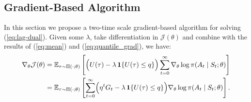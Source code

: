\subsection{Gradient-Based Algorithm}
In this section we propose a two-time scale gradient-based algorithm for solving (\ref{eq:lag-dual}). Given some $\lambda$, take differentiation in $\mathcal{J}(\theta)$ and combine with the results of (\ref{eq:mean}) and (\ref{eq:quantile_grad}), we have:
\textbf{\textcolor{ECNURed}{
\begin{align} \label{mix_gradient}
    \nabla_\theta\mathcal{J}(\theta)
    &=\mathbb E_{\tau\sim\Pi(\cdot;\theta)}\left[\Bigl(U(\tau)-\lambda\,\mathbf 1\{U(\tau)\le q\}\Bigr)\sum_{t=0}^\infty\nabla_\theta\log\pi(A_t\mid S_t;\theta)\right]\\
    &=\mathbb E_{\tau\sim\Pi(\cdot;\theta)}\left[\sum_{t=0}^\infty\Bigl(\eta^t G_t-\lambda\,\mathbf 1\{U(\tau)\le q\}\Bigr) \nabla_\theta\log\pi(A_t\mid S_t;\theta)\right].
\end{align}
}}

